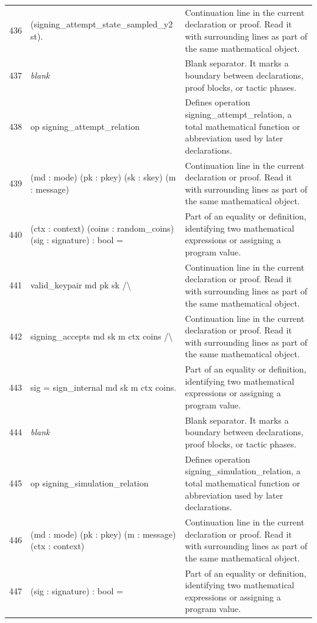 \documentclass[10pt]{article}
\begin{document}
\begin{longtable}{r L{0.53\textwidth} L{0.37\textwidth}}
436 & {\ttfamily\scriptsize     (signing\_attempt\_state\_sampled\_y2 st).} & Continuation line in the current declaration or proof.  Read it with surrounding lines as part of the same mathematical object. \\
437 & {\ttfamily\scriptsize \emph{blank}} & Blank separator.  It marks a boundary between declarations, proof blocks, or tactic phases. \\
438 & {\ttfamily\scriptsize op signing\_attempt\_relation} & Defines operation signing\_attempt\_relation, a total mathematical function or abbreviation used by later declarations. \\
439 & {\ttfamily\scriptsize    (md : mode) (pk : pkey) (sk : skey) (m : message)} & Continuation line in the current declaration or proof.  Read it with surrounding lines as part of the same mathematical object. \\
440 & {\ttfamily\scriptsize    (ctx : context) (coins : random\_coins) (sig : signature) : bool =} & Part of an equality or definition, identifying two mathematical expressions or assigning a program value. \\
441 & {\ttfamily\scriptsize   valid\_keypair md pk sk /\textbackslash{}} & Continuation line in the current declaration or proof.  Read it with surrounding lines as part of the same mathematical object. \\
442 & {\ttfamily\scriptsize   signing\_accepts md sk m ctx coins /\textbackslash{}} & Continuation line in the current declaration or proof.  Read it with surrounding lines as part of the same mathematical object. \\
443 & {\ttfamily\scriptsize   sig = sign\_internal md sk m ctx coins.} & Part of an equality or definition, identifying two mathematical expressions or assigning a program value. \\
444 & {\ttfamily\scriptsize \emph{blank}} & Blank separator.  It marks a boundary between declarations, proof blocks, or tactic phases. \\
445 & {\ttfamily\scriptsize op signing\_simulation\_relation} & Defines operation signing\_simulation\_relation, a total mathematical function or abbreviation used by later declarations. \\
446 & {\ttfamily\scriptsize    (md : mode) (pk : pkey) (m : message) (ctx : context)} & Continuation line in the current declaration or proof.  Read it with surrounding lines as part of the same mathematical object. \\
447 & {\ttfamily\scriptsize    (sig : signature) : bool =} & Part of an equality or definition, identifying two mathematical expressions or assigning a program value. \\

\end{longtable}
\end{document}
